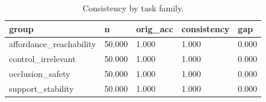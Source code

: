 \begin{table}[t]
\centering
\begin{tabular}{lllll}
\toprule
group & n & orig_acc & consistency & gap \\
\midrule
affordance_reachability & 50.000 & 1.000 & 1.000 & 0.000 \\
control_irrelevant & 50.000 & 1.000 & 1.000 & 0.000 \\
occlusion_safety & 50.000 & 1.000 & 1.000 & 0.000 \\
support_stability & 50.000 & 1.000 & 1.000 & 0.000 \\
\bottomrule
\end{tabular}
\caption{Consistency by task family.}
\end{table}

